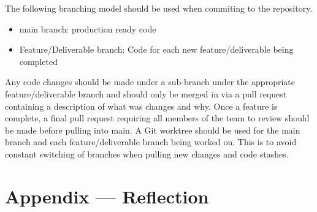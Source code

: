 \documentclass{article}
\begin{document}
The following branching model should be used when commiting to the repository.
\begin{itemize}
  \item main branch: production ready code
  \item Feature/Deliverable branch: Code for each new feature/deliverable being completed
\end{itemize}

Any code changes should be made under a sub-branch under the appropriate feature/deliverable branch and should only be merged in via a pull request containing a description of what was changes and why. Once a feature is complete, a final pull request requiring all members of the team to review should be made before pulling into main.
\newline\newline
A Git worktree should be used for the main branch and each feature/deliverable branch being worked on. This is to avoid constant switching of branches when pulling new changes and code stashes.

\newpage{}

\section*{Appendix --- Reflection}
\end{document}
